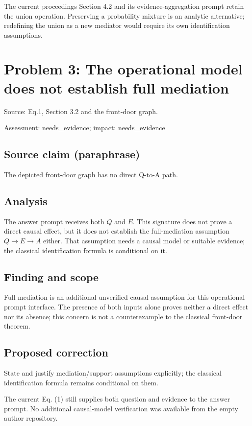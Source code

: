 \documentclass[11pt]{article}
\begin{document}
The current proceedings Section 4.2 and its evidence-aggregation prompt retain the union operation. Preserving a probability mixture is an analytic alternative; redefining the union as a new mediator would require its own identification assumptions.

\section*{Problem 3: The operational model does not establish full mediation}

Source: Eq.1, Section 3.2 and the front-door graph.

Assessment: needs\_evidence; impact: needs\_evidence

\subsection*{Source claim (paraphrase)}

The depicted front-door graph has no direct Q-to-A path.

\subsection*{Analysis}

The answer prompt receives both \(Q\) and \(E\). This signature does not prove a direct causal effect, but it does not establish the full-mediation assumption \(Q\to E\to A\) either. That assumption needs a causal model or suitable evidence; the classical identification formula is conditional on it.

\subsection*{Finding and scope}

Full mediation is an additional unverified causal assumption for this operational prompt interface. The presence of both inputs alone proves neither a direct effect nor its absence; this concern is not a counterexample to the classical front-door theorem.

\subsection*{Proposed correction}

State and justify mediation/support assumptions explicitly; the classical identification formula remains conditional on them.

The current Eq. (1) still supplies both question and evidence to the answer prompt. No additional causal-model verification was available from the empty author repository.
\end{document}
